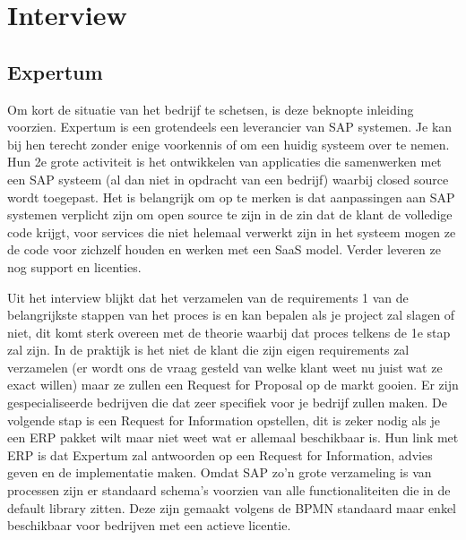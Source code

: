 
\chapter{Interview}
\label{ch:interview}

\section{Expertum}

Om kort de situatie van het bedrijf te schetsen, is deze beknopte inleiding voorzien. Expertum is een grotendeels een leverancier van SAP systemen. Je kan bij hen terecht zonder enige voorkennis of om een huidig systeem over te nemen. Hun 2e grote activiteit is het ontwikkelen van applicaties die samenwerken met een SAP systeem (al dan niet in opdracht van een bedrijf) waarbij closed source wordt toegepast. Het is belangrijk om op te merken is dat aanpassingen aan SAP systemen verplicht zijn om open source te zijn in de zin dat de klant de volledige code krijgt, voor services die niet helemaal verwerkt zijn in het systeem mogen ze de code voor zichzelf houden en werken met een SaaS model. Verder leveren ze nog support en licenties.

Uit het interview blijkt dat het verzamelen van de requirements 1 van de belangrijkste stappen van het proces is en kan bepalen als je project zal slagen of niet, dit komt sterk overeen met de theorie waarbij dat proces telkens de 1e stap zal zijn. In de praktijk is het niet de klant die zijn eigen requirements zal verzamelen (er wordt ons de vraag gesteld van welke klant weet nu juist wat ze exact willen) maar ze zullen een Request for Proposal op de markt gooien. Er zijn gespecialiseerde bedrijven die dat zeer specifiek voor je bedrijf zullen maken. De volgende stap is een Request for Information opstellen, dit is zeker nodig als je een ERP pakket wilt maar niet weet wat er allemaal beschikbaar is. Hun link met ERP is dat Expertum zal antwoorden op een Request for Information, advies geven en de implementatie maken. Omdat SAP zo'n grote verzameling is van processen zijn er standaard schema's voorzien van alle functionaliteiten die in de default library zitten. Deze zijn gemaakt volgens de BPMN standaard maar enkel beschikbaar voor bedrijven met een actieve licentie. 

